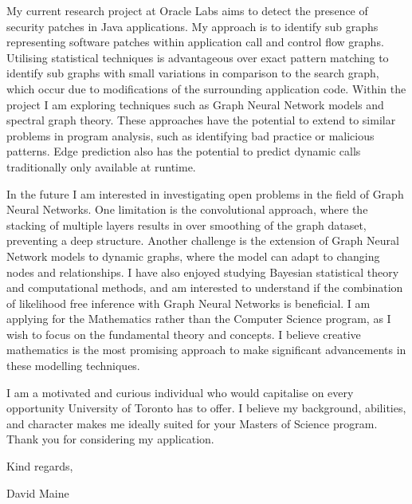 My current research project at Oracle Labs aims to detect the presence of security patches in Java applications. My approach is to identify sub graphs representing software patches within application call and control flow graphs. Utilising statistical techniques is advantageous over exact pattern matching to identify sub graphs with small variations in comparison to the search graph, which occur due to modifications of the surrounding application code. Within the project I am exploring techniques such as Graph Neural Network models and spectral graph theory. These approaches have the potential to extend to similar problems in program analysis, such as identifying bad practice or malicious patterns. Edge prediction also has the potential to predict dynamic calls traditionally only available at runtime.
\vspace*{10pt}

In the future I am interested in investigating open problems in the field of Graph Neural Networks. One limitation is the convolutional approach, where the stacking of multiple layers results in over smoothing of the graph dataset, preventing a deep structure. Another challenge is the extension of Graph Neural Network models to dynamic graphs, where the model can adapt to changing nodes and relationships. I have also enjoyed studying Bayesian statistical theory and computational methods, and am interested to understand if the combination of likelihood free inference with Graph Neural Networks is beneficial. I am applying for the Mathematics rather than the Computer Science program, as I wish to focus on the fundamental theory and concepts. I believe creative mathematics is the most promising approach to make significant advancements in these modelling techniques.
\vspace*{10pt}

I am a motivated and curious individual who would capitalise on every opportunity University of Toronto has to offer. I believe my background, abilities, and character makes me ideally suited for your Masters of Science program. Thank you for considering my application.

\vfill
\noindent
Kind regards,
\vspace*{10pt}

\noindent
David Maine